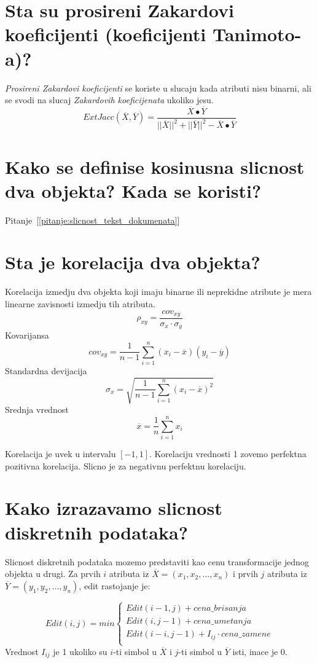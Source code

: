 \documentclass[a4paper]{article}
\begin{document}
\section{Sta su prosireni Zakardovi koeficijenti (koeficijenti Tanimoto-a)?}
\emph{Prosireni Zakardovi koeficijenti} se koriste u slucaju kada atributi nisu binarni, ali se
svodi na slucaj \emph{Zakardovih koeficijenata} ukoliko jesu.
\begin{equation}\label{eq:prosireni_zakard_tanimoto}
    ExtJacc(\overline{X},\overline{Y}) =
    \dfrac{
        \overline{X} \bullet \overline{Y}
    }{
        ||\overline{X}||^2 + ||\overline{Y}||^2
        - \overline{X} \bullet \overline{Y}
    }
\end{equation}

\section{Kako se definise kosinusna slicnost dva objekta? Kada se koristi?}

Pitanje~[\ref{pitanje:slicnost_tekst_dokumenata}]

\section{Sta je korelacija dva objekta?}
Korelacija izmedju dva objekta koji imaju binarne ili neprekidne atribute je mera linearne
zavisnosti izmedju tih atributa.
\[
    \rho_{xy} = \dfrac{cov_{xy}}{\sigma_x \cdot \sigma_y}
\]
Kovarijansa
\[
    cov_{xy} = \dfrac{1}{n-1}\sum_{i=1}^{n} (x_i - \overline{x})(y_i - \overline{y})
\]
Standardna devijacija
\[
    \sigma_x = \sqrt{\dfrac{1}{n-1}\sum_{i=1}^{n} (x_i - \overline{x})^2}
\]
Srednja vrednost
\[
    \overline{x} = \dfrac{1}{n}\sum_{i=1}^{n} x_i
\]

Korelacija je uvek u intervalu \([-1,1]\). Korelaciju vrednosti 1 zovemo perfektna pozitivna
korelacija. Slicno je za negativnu perfektnu korelaciju.


\section{Kako izrazavamo slicnost diskretnih podataka?}
Slicnost diskretnih podataka mozemo predstaviti kao cenu transformacije jednog objekta u drugi.
Za prvih \(i\) atributa iz \(\overline{X}=(x_1,x_2,\ldots,x_n)\) i prvih \(j\) atributa iz
\(\overline{Y}=(y_1,y_2,\ldots,y_n)\), edit rastojanje je:

\[
    Edit(i, j) = min
    \begin{cases}
        Edit(i-1, j) + cena\_brisanja \\
        Edit(i, j-1) + cena\_umetanja \\
        Edit(i-i, j-1) + I_{ij} \cdot cena\_zamene \\
    \end{cases}
\]
Vrednost \(I_{ij}\) je 1 ukoliko su \(i\)-ti simbol u \(\overline{X}\) i \(j\)-ti simbol u
\(\overline{Y}\) isti, inace je 0.
\end{document}
